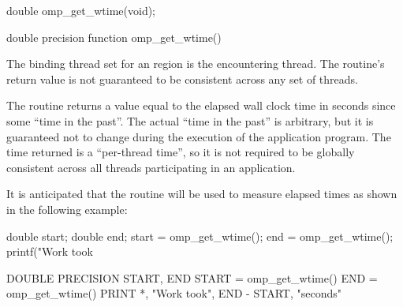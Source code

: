 \format
\begin{ccppspecific}
\begin{ompcFunction}
double omp_get_wtime(void);
\end{ompcFunction}
\end{ccppspecific}

\begin{fortranspecific}
\begin{ompfFunction}
double precision function omp_get_wtime()
\end{ompfFunction}
\end{fortranspecific}

\binding
The binding thread set for an  region is the encountering thread. The
routine's return value is not guaranteed to be consistent across any set of threads.

\effect
The  routine returns a value equal to the elapsed wall clock time in
seconds since some ``time in the past''. The actual ``time in the past'' is arbitrary, but it is
guaranteed not to change during the execution of the application program. The time
returned is a ``per-thread time'', so it is not required to be globally consistent across all
threads participating in an application.

\begin{note}
It is anticipated that the routine will be used to measure elapsed times as shown
in the following example:

\begin{ccppspecific}
\begin{ompcFunction}
double start;
double end;
start = omp_get_wtime();
end = omp_get_wtime();
printf("Work took %
\end{ompcFunction}
\end{ccppspecific}

\begin{fortranspecific}
\begin{ompcFunction}
DOUBLE PRECISION START, END
START = omp_get_wtime()
END = omp_get_wtime()
PRINT *, "Work took", END - START, "seconds"
\end{ompcFunction}
\end{fortranspecific}
\end{note}









